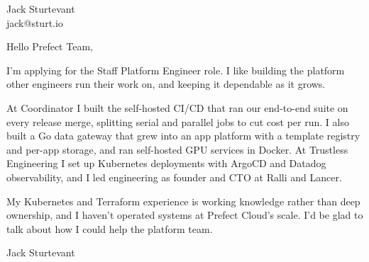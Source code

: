 \documentclass[11pt]{article}
\begin{document}
\raggedright

{\namefont\fontsize{20pt}{24pt}\selectfont Jack Sturtevant}\\[-0.3em]
jack@sturt.io

\vspace{1.2em}

Hello Prefect Team,

I'm applying for the Staff Platform Engineer role. I like building the platform other engineers run their work on, and keeping it dependable as it grows.

At Coordinator I built the self-hosted CI/CD that ran our end-to-end suite on every release merge, splitting serial and parallel jobs to cut cost per run. I also built a Go data gateway that grew into an app platform with a template registry and per-app storage, and ran self-hosted GPU services in Docker. At Trustless Engineering I set up Kubernetes deployments with ArgoCD and Datadog observability, and I led engineering as founder and CTO at Ralli and Lancer.

My Kubernetes and Terraform experience is working knowledge rather than deep ownership, and I haven't operated systems at Prefect Cloud's scale. I'd be glad to talk about how I could help the platform team.

\vspace{0.6em}
Jack Sturtevant
\end{document}
